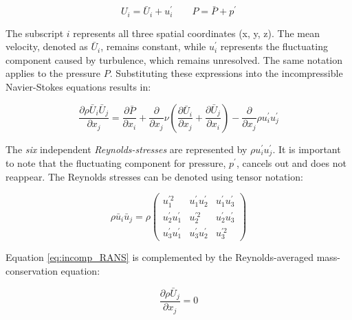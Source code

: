 \begin{equation}
    U_{i} = \bar U_{i} + u_{i}^{\prime} \qquad
    P = \bar P + p^{\prime}
\end{equation}

\noindent The subscript $i$ represents all three spatial coordinates (x, y, z).
The mean velocity, denoted as $\bar U_{i}$, remains constant, while
$u_{i}^{\prime}$ represents the fluctuating component caused by turbulence,
which remains unresolved. The same notation applies to the pressure $P$.
Substituting these expressions into the incompressible Navier-Stokes equations
results in:

\begin{equation}
    \label{eq:incomp_RANS}
    \frac{\partial \rho \bar U_{i} \bar U_{j}}{\partial x_{j}} =
    \frac{\partial \bar P}{\partial x_{i}} +
    \frac{\partial}{\partial x_{j}} \nu (\frac{\partial 
    \bar U_{i}}{\partial x_{j}} +
    \frac{\partial \bar U_{j}}{\partial x_{i}}) -
    \frac{\partial}{\partial x_{j}} \rho u_{i}^{\prime} u_{j}^{\prime}
\end{equation}

\noindent The \textit{six} independent \textit{Reynolds-stresses} are
represented by $\rho u_{i}^{\prime} u_{j}^{\prime}$. It is important to note
that the fluctuating component for pressure, $p^{\prime}$, cancels out and does
not reappear. The Reynolds stresses can be denoted using tensor notation:

\begin{equation}
    \rho \bar u_{i} \bar u_{j} = \rho
    \begin{pmatrix}
        u_{1}^{\prime 2}              & u_{1}^{\prime} u_{2}^{\prime} & 
        u_{1}^{\prime} u_{3}^{\prime} \\

        u_{2}^{\prime} u_{1}^{\prime} & u_{2}^{\prime 2}              & 
        u_{2}^{\prime} u_{3}^{\prime} \\

        u_{3}^{\prime} u_{1}^{\prime} & u_{3}^{\prime} u_{2}^{\prime} & 
        u_{3}^{\prime 2}
    \end{pmatrix}
\end{equation}

\noindent Equation \ref{eq:incomp_RANS} is complemented by the Reynolds-averaged
mass-conservation equation:

\begin{equation}
    \frac{\partial \rho \bar U_{j}}{\partial x_{j}} = 0
\end{equation}


